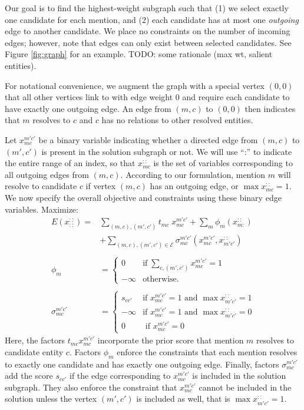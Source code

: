 \documentclass[11pt,letterpaper]{article}
\begin{document}
Our goal is to find the highest-weight subgraph such that (1) we select exactly one candidate for each mention, and (2) each candidate has at most one \emph{outgoing} edge to another candidate. We place no constraints on the number of incoming edges; however, note that edges can only exist between selected candidates. See Figure \ref{fig:graph} for an example. TODO: some rationale (max wt, salient entities).

For notational convenience, we augment the graph with a special vertex $(0, 0)$ that all other vertices link to with edge weight $0$ and require each candidate to have exactly one outgoing edge. An edge from $(m, c)$ to $(0, 0)$ then indicates that $m$ resolves to $c$ and $c$ has no relations to other resolved entities. 

Let $x_{mc}^{m'c'}$ be a binary variable indicating whether a directed edge from $(m, c)$ to $(m', c')$ is present in the solution subgraph or not. We will use ``:'' to indicate the entire range of an index, so that $x_{mc}^{::}$ is the set of variables corresponding to all outgoing edges from $(m,c)$.  According to our formulation, mention $m$ will resolve to candidate $c$ if vertex $(m,c)$ has an outgoing edge, or $ \max x_{mc}^{::}=1$. We now specify the overall objective and constraints using these binary edge variables. Maximize:
\begin{align}
E(x_{::}^{::}) =& \sum_{(m, c), (m',c')} t_{mc} \;x^{m'c'}_{mc}  + \sum_m \phi_m( x_{m:}^{::}) \nonumber \\
&+ \sum_{(m,c), (m', c') \in \mathcal{E}} \sigma_{mc}^{m'c'}(x_{mc}^{m'c'}, x_{m'c'}^{::}) \\ \nonumber \\
\phi_{m}&= 
\begin{cases} 
0 & \text{if} \; \sum_{c, (m',c')} x^{m'c'}_{mc} = 1 \\
-\infty & \text{otherwise.}
\end{cases} \\ \nonumber \\
\sigma_{mc}^{m'c'} &= %
\begin{cases}
 s_{cc'} & \text{if $x_{mc}^{m'c'}=1$ and $\max x_{m'c'}^{::} =1$} \\
 -\infty & \text{if $x_{mc}^{m'c'}=1$ and $\max x_{m'c'}^{::}=0$} \\
  0 & \text{ if $x_{mc}^{m'c'} = 0$ } 
 \end{cases}
\end{align}
Here, the factors $t_{mc} x_{mc}^{m'c'}$ incorporate the prior score that mention $m$ resolves to candidate entity $c$. 
Factors $\phi_m$ enforce the constraints that each mention resolves to exactly one candidate and has exactly one outgoing edge. 
Finally, factors $\sigma_{mc}^{m'c'}$ add the score $s_{cc'}$ if the edge corresponding to $x_{mc}^{m'c'}$ is included in the solution subgraph. They also enforce the constraint that $x_{mc}^{m'c'}$ cannot be included in the solution unless the vertex $(m', c')$ is included as well, that is  $\max x_{m'c'}^{::} = 1$.
\end{document}
